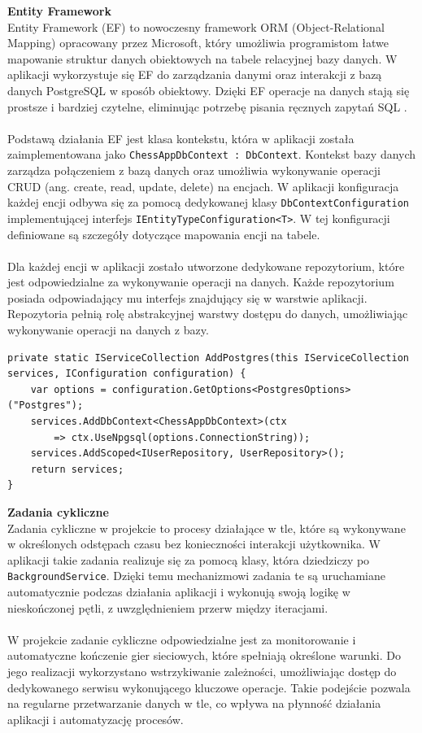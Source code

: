 \documentclass[twoside]{projektInzynierskiMS1}
\begin{document}
\newpage

\noindent \textbf{Entity Framework}\\
Entity Framework (EF) to nowoczesny framework ORM (Object-Relational Mapping) opracowany przez Microsoft, który umożliwia programistom łatwe mapowanie struktur danych obiektowych na tabele relacyjnej bazy danych. W aplikacji wykorzystuje się EF do zarządzania danymi oraz interakcji z bazą danych PostgreSQL w sposób obiektowy. Dzięki EF operacje na danych stają się prostsze i bardziej czytelne, eliminując potrzebę pisania ręcznych zapytań SQL \cite{PostgresEF}.
\\\\
Podstawą działania EF jest klasa kontekstu, która w aplikacji została zaimplementowana jako \texttt{ChessAppDbContext : DbContext}. Kontekst bazy danych zarządza połączeniem z bazą danych oraz umożliwia wykonywanie operacji CRUD (ang. create, read, update, delete) na encjach. W aplikacji konfiguracja każdej encji odbywa się za pomocą dedykowanej klasy \texttt{DbContextConfiguration } implementującej interfejs \texttt{IEntityTypeConfiguration<T>}. W tej konfiguracji definiowane są szczegóły dotyczące mapowania encji na tabele.
\\\\
Dla każdej encji w aplikacji zostało utworzone dedykowane repozytorium, które jest odpowiedzialne za wykonywanie operacji na danych. Każde repozytorium posiada odpowiadający mu interfejs znajdujący się w warstwie aplikacji. Repozytoria pełnią rolę abstrakcyjnej warstwy dostępu do danych, umożliwiając wykonywanie operacji na danych z bazy.

\vspace{0.5cm}
\begin{lstlisting}[language=CSharp]
private static IServiceCollection AddPostgres(this IServiceCollection services, IConfiguration configuration) {
    var options = configuration.GetOptions<PostgresOptions>("Postgres");
    services.AddDbContext<ChessAppDbContext>(ctx
        => ctx.UseNpgsql(options.ConnectionString));
    services.AddScoped<IUserRepository, UserRepository>();
    return services;
}
\end{lstlisting}

\newpage

\noindent \textbf{Zadania cykliczne}\\
Zadania cykliczne w projekcie to procesy działające w tle, które są wykonywane w określonych odstępach czasu bez konieczności interakcji użytkownika. W aplikacji takie zadania realizuje się za pomocą klasy, która dziedziczy po \texttt{BackgroundService}. Dzięki temu mechanizmowi zadania te są uruchamiane automatycznie podczas działania aplikacji i wykonują swoją logikę w nieskończonej pętli, z uwzględnieniem przerw między iteracjami.
\\\\
W projekcie zadanie cykliczne odpowiedzialne jest za monitorowanie i automatyczne kończenie gier sieciowych, które spełniają określone warunki. Do jego realizacji wykorzystano wstrzykiwanie zależności, umożliwiając dostęp do dedykowanego serwisu wykonującego kluczowe operacje. Takie podejście pozwala na regularne przetwarzanie danych w tle, co wpływa na płynność działania aplikacji i automatyzację procesów.
\end{document}
